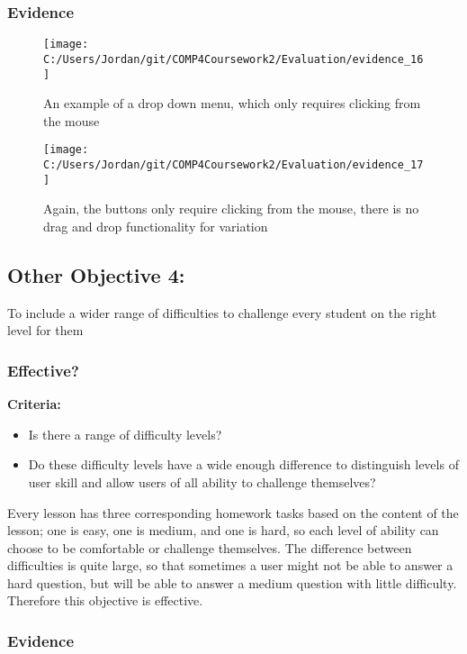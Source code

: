 \subsubsection{Evidence}

\begin{figure}[H]
	\texttt{[image: C:/Users/Jordan/git/COMP4Coursework2/Evaluation/evidence\_16]}
	\caption{An example of a drop down menu, which only requires clicking from the mouse}
\end{figure}

\begin{figure}[H]
	\texttt{[image: C:/Users/Jordan/git/COMP4Coursework2/Evaluation/evidence\_17]}
	\caption{Again, the buttons only require clicking from the mouse, there is no drag and drop functionality for variation}
\end{figure}

\subsection{Other Objective 4: }

To include a wider range of difficulties to challenge every student on the right level for them

\subsubsection{Effective?}

\textbf{Criteria: }

\begin{itemize}
	\item Is there a range of difficulty levels?
	\item Do these difficulty levels have a wide enough difference to distinguish levels of user skill and allow users of all ability to challenge themselves?
\end{itemize}

Every lesson has three corresponding homework tasks based on the content of the lesson; one is easy, one is medium, and one is hard, so each level of ability can choose to be comfortable or challenge themselves. The difference between difficulties is quite large, so that sometimes a user might not be able to answer a hard question, but will be able to answer a medium question with little difficulty. Therefore this objective is effective.

\subsubsection{Evidence}

